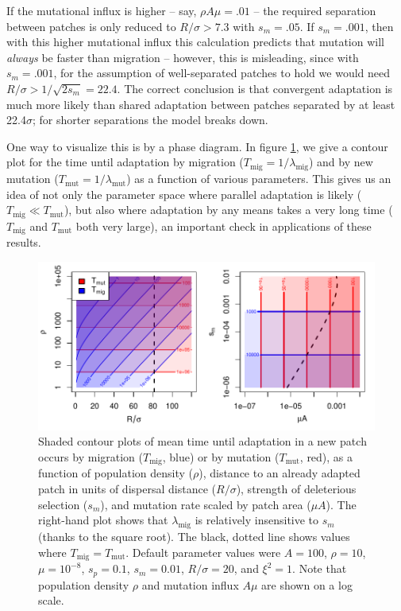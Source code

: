 \documentclass{article}
\newcommand{\migrate}{\lambda_\text{mig}}
\newcommand{\mutrate}{\lambda_\text{mut}}
\newcommand{\Tmig}{T_\text{mig}}
\newcommand{\Tmut}{T_\text{mut}}
\begin{document}
If the mutational influx is higher -- say, $\rho A \mu = .01$ --
the required separation between patches is only reduced to $R/\sigma > 7.3$ with $s_m=.05$.
If $s_m=.001$, then with this higher mutational influx this calculation predicts that mutation will \emph{always} be faster than migration
-- however, this is misleading, 
since with $s_m=.001$, for the assumption of well-separated patches to hold we would need $R/\sigma > 1/\sqrt{2s_m} = 22.4$.
The correct conclusion is that convergent adaptation is much more likely than shared adaptation
between patches separated by at least 22.4$\sigma$;
for shorter separations the model breaks down.

One way to visualize this is by a phase diagram.
In figure \ref{fig:phase_diagram},
we give a contour plot for the time until adaptation by migration ($\Tmig = 1/\migrate$) and by new mutation ($\Tmut=1/\mutrate$)
as a function of various parameters. 
This gives us an idea of not only the parameter space where parallel adaptation is likely ($\Tmig \ll \Tmut$),
but also where adaptation by any means takes a very long time ($\Tmig$ and $\Tmut$ both very large),
an important check in applications of these results.

\begin{figure}[ht]
  \begin{center}
    \includegraphics{phase-diagram-log}
  \end{center}
  \caption{
  Shaded contour plots of
  mean time until adaptation in a new patch occurs by migration ($\Tmig$, blue) or by mutation ($\Tmut$, red),
  as a function of population density ($\rho$), 
  distance to an already adapted patch in units of dispersal distance ($R/\sigma$),
  strength of deleterious selection ($s_m$),
  and mutation rate scaled by patch area ($\mu A$).
  The right-hand plot shows that $\migrate$ is relatively insensitive to $s_m$ (thanks to the square root).
  The black, dotted line shows values where $\Tmig=\Tmut$.
  Default parameter values were $A=100$, $\rho=10$, $\mu=10^{-8}$, $s_p=0.1$, $s_m=0.01$, $R/\sigma=20$, and $\xi^2=1$.
  Note that population density $\rho$ and mutation influx $A\mu$ are shown on a log scale.
  \label{fig:phase_diagram}
  }
\end{figure}
\end{document}
